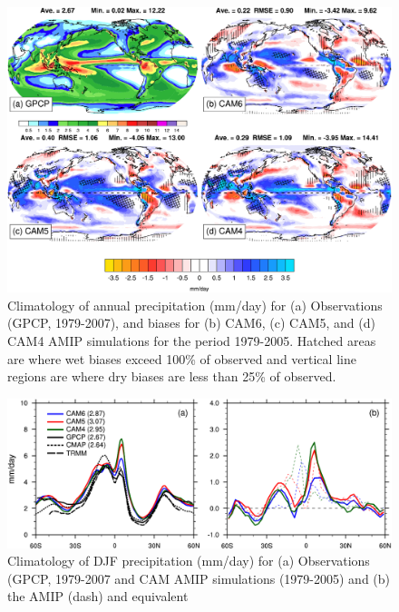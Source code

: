 \clearpage
\begin{figure}[t]
  \begin{center}
    \includegraphics[width=1.\textwidth,angle=0.]{./figs/f_PRECT_2D_CAM456.pdf}
  \end{center}
  \caption{Climatology of annual precipitation (mm/day) for (a) Observations (GPCP, 1979-2007), and biases for (b) CAM6, (c) CAM5, and (d) CAM4 AMIP simulations for the period 1979-2005. Hatched areas are where wet biases exceed 100\% of observed and vertical line regions are where dry biases are less than 25\% of observed.}
\label{f_PRECT_2D_CAM456}
\end{figure}
\clearpage
\begin{figure}[t]
    \includegraphics[width=1.\textwidth,angle=0.]{./figs/f_PRECT_1D_DJF_CAM456.pdf}
  \caption{Climatology of DJF precipitation (mm/day) for (a) Observations (GPCP, 1979-2007 and CAM AMIP simulations (1979-2005) and (b) the AMIP (dash) and equivalent} 
\label{f_PRECT_1D_DJF_CAM456}
\end{figure} 

